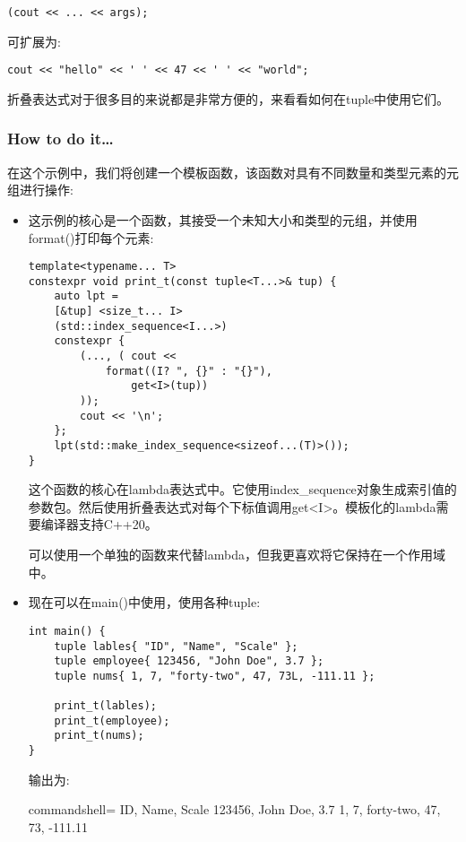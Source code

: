 \begin{lstlisting}[style=styleCXX]
(cout << ... << args);
\end{lstlisting}

可扩展为:

\begin{lstlisting}[style=styleCXX]
cout << "hello" << ' ' << 47 << ' ' << "world";
\end{lstlisting}

折叠表达式对于很多目的来说都是非常方便的，来看看如何在tuple中使用它们。

\subsubsection{How to do it…}

在这个示例中，我们将创建一个模板函数，该函数对具有不同数量和类型元素的元组进行操作:

\begin{itemize}
\item 
这示例的核心是一个函数，其接受一个未知大小和类型的元组，并使用format()打印每个元素:

\begin{lstlisting}[style=styleCXX]
template<typename... T>
constexpr void print_t(const tuple<T...>& tup) {
	auto lpt =
	[&tup] <size_t... I>
	(std::index_sequence<I...>)
	constexpr {
		(..., ( cout <<
			format((I? ", {}" : "{}"),
				get<I>(tup))
		));
		cout << '\n';
	};
	lpt(std::make_index_sequence<sizeof...(T)>());
}
\end{lstlisting}

这个函数的核心在lambda表达式中。它使用index\_sequence对象生成索引值的参数包。然后使用折叠表达式对每个下标值调用get<I>。模板化的lambda需要编译器支持C++20。

可以使用一个单独的函数来代替lambda，但我更喜欢将它保持在一个作用域中。

\item 
现在可以在main()中使用，使用各种tuple:

\begin{lstlisting}[style=styleCXX]
int main() {
	tuple lables{ "ID", "Name", "Scale" };
	tuple employee{ 123456, "John Doe", 3.7 };
	tuple nums{ 1, 7, "forty-two", 47, 73L, -111.11 };
	
	print_t(lables);
	print_t(employee);
	print_t(nums);
}
\end{lstlisting}

输出为:

\begin{tcblisting}{commandshell={}}
ID, Name, Scale
123456, John Doe, 3.7
1, 7, forty-two, 47, 73, -111.11
\end{tcblisting}
\end{itemize}


